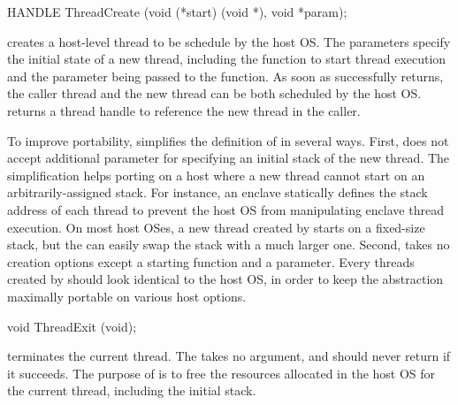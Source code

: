 \begin{paldef}
HANDLE ThreadCreate (void (*start) (void *), void *param);
\end{paldef}


 creates a host-level thread to be schedule by the host OS.
The parameters specify the initial state of a new thread, including the function to start thread execution and the parameter being passed to the function.
As soon as  successfully returns,
the caller thread and the new thread can be both scheduled by the host OS. %
 returns a thread handle to reference the new thread in the caller.




To improve portability, \graphene{} simplifies
the definition of  in several ways.
First,  does not accept additional parameter for specifying
an initial stack of the new thread.
The simplification helps porting 
on a host where a new thread cannot start
on an arbitrarily-assigned stack.
For instance, an \sgx{} enclave statically defines the stack address of each thread
to prevent the host OS from manipulating
enclave thread execution.
On most host OSes, a new thread created by  starts on a fixed-size stack, but the \libos{} can easily swap the stack with a much larger one.
Second,  takes no creation options
except a starting function and a parameter.
Every threads created by  should look identical to the host OS,
in order to keep the abstraction maximally portable
on various host options.



\begin{paldef}
void ThreadExit (void);
\end{paldef}

 terminates the current thread. The \hostapi{} takes no argument, and should never return if it succeeds.
The purpose of  is to free the resources allocated in the host OS
for the current thread, including the initial stack.






